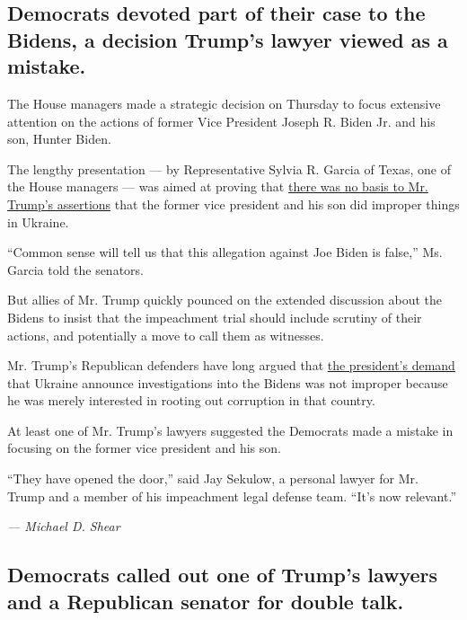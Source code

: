 \hypertarget{democrats-devoted-part-of-their-case-to-the-bidens-a-decision-trumps-lawyer-viewed-as-a-mistake}{%
\subsection{Democrats devoted part of their case to the Bidens, a
decision Trump's lawyer viewed as a
mistake.}\label{democrats-devoted-part-of-their-case-to-the-bidens-a-decision-trumps-lawyer-viewed-as-a-mistake}}

The House managers made a strategic decision on Thursday to focus
extensive attention on the actions of former Vice President Joseph R.
Biden Jr. and his son, Hunter Biden.

The lengthy presentation --- by Representative Sylvia R. Garcia of
Texas, one of the House managers --- was aimed at proving that
\href{https://www.nytimes3xbfgragh.onion/2019/09/22/us/politics/biden-ukraine-trump.html}{there
was no basis to Mr. Trump's assertions} that the former vice president
and his son did improper things in Ukraine.

``Common sense will tell us that this allegation against Joe Biden is
false,'' Ms. Garcia told the senators.

But allies of Mr. Trump quickly pounced on the extended discussion about
the Bidens to insist that the impeachment trial should include scrutiny
of their actions, and potentially a move to call them as witnesses.

Mr. Trump's Republican defenders have long argued that
\href{https://www.nytimes3xbfgragh.onion/interactive/2020/01/22/us/politics/impeachment-articles-arguments.html}{the
president's demand} that Ukraine announce investigations into the Bidens
was not improper because he was merely interested in rooting out
corruption in that country.

At least one of Mr. Trump's lawyers suggested the Democrats made a
mistake in focusing on the former vice president and his son.

``They have opened the door,'' said Jay Sekulow, a personal lawyer for
Mr. Trump and a member of his impeachment legal defense team. ``It's now
relevant.''

\emph{--- Michael D. Shear}

\hypertarget{democrats-called-out-one-of-trumps-lawyers-and-a-republican-senator-for-double-talk}{%
\subsection{Democrats called out one of Trump's lawyers and a Republican
senator for double
talk.}\label{democrats-called-out-one-of-trumps-lawyers-and-a-republican-senator-for-double-talk}}

